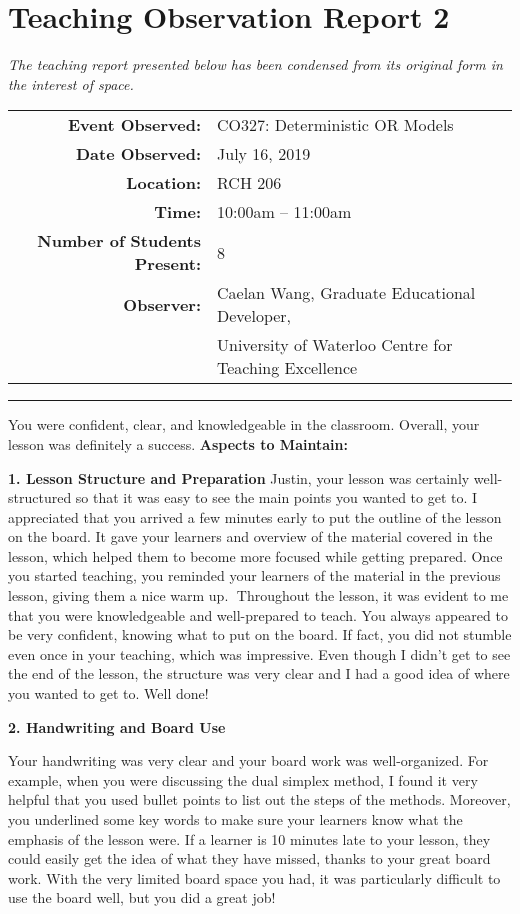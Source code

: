 \documentclass{article}
\begin{document}
\section{Teaching Observation Report 2}\label{sec:observation-report-2}
\emph{The teaching report presented below has been condensed from its original form in the interest of space.}

\begin{tabular}{r l}
    \textbf{Event Observed:}&	CO327: Deterministic OR Models\\
    \textbf{Date Observed:}&	July 16, 2019\\
    \textbf{Location:}&	RCH 206\\
    \textbf{Time:}&	10:00am – 11:00am\\
    \textbf{Number of Students Present:}&	8\\
    \textbf{Observer:}&	Caelan Wang, Graduate Educational Developer,\\
         &University of Waterloo Centre for Teaching Excellence
\end{tabular}

\rule{\linewidth}{0.25mm}
You were confident, clear, and knowledgeable in the classroom. Overall, your lesson was definitely a success.\newline
\textbf{Aspects to Maintain:}

\textbf{1. Lesson Structure and Preparation}
Justin, your lesson was certainly well-structured so that it was easy to see the main points you wanted to get to. I appreciated that you arrived a few minutes early to put the outline of the lesson on the board. It gave your learners and overview of the material covered in the lesson, which helped them to become more focused while getting prepared. Once you started teaching, you reminded your learners of the material in the previous lesson, giving them a nice warm up.
Throughout the lesson, it was evident to me that you were knowledgeable and well-prepared to teach. You always appeared to be very confident, knowing what to put on the board. If fact, you did not stumble even once in your teaching, which was impressive. Even though I didn’t get to see the end of the lesson, the structure was very clear and I had a good idea of where you wanted to get to. Well done!

\textbf{2. Handwriting and Board Use}

Your handwriting was very clear and your board work was well-organized. For example, when you were discussing the dual simplex method, I found it very helpful that you used bullet points to list out the steps of the methods. Moreover, you underlined some key words to make sure your learners know what the emphasis of the lesson were. If a learner is 10 minutes late to your lesson, they could easily get the idea of what they have missed, thanks to your great board work. With the very limited board space you had, it was particularly difficult to use the board well, but you did a great job!
\end{document}
